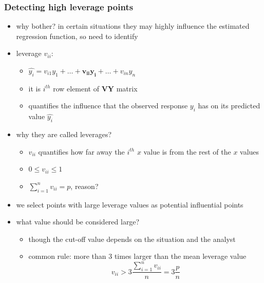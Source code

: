 \documentclass[
	11pt, %
]{beamer}
\begin{document}
\begin{frame}[allowframebreaks]
	\frametitle{Detecting high leverage points}
	\begin{itemize}
		\item why bother? in certain situations they may highly influence the estimated regression function, so need to identify
		\item leverage $v_{ii}$: 
		\begin{itemize}
			\item $\hat{y_i}=v_{i1}y_1+\ldots+\mathbf{v_{ii}y_i}+\ldots+v_{in}y_n$
			\item it is $i^{th}$ row element of $\mathbf{VY}$ matrix
			\item quantifies the influence that the observed response $y_i$ has on its predicted value $\hat{y_i}$
		\end{itemize}
		\item why they are called leverages?
		\begin{itemize}
			\item $v_{ii}$ quantifies how far away the $i^{th}$ $x$ value is from the rest of the $x$ values
		   \item $0 \leq v_{ii} \leq 1$
		   \item $\sum_{i=1}^n v_{ii}=p$, reason?
		\end{itemize}
		\item we select points with large leverage values as potential influential points
		\item what value should be considered large? 
		\begin{itemize}
			\item though the cut-off value depends on the situation and the analyst
			\item common rule: more than 3 times larger than the mean leverage value
			\begin{equation*}
				v_{ii}>3\frac{\sum_{i=1}^n v_{ii}}{n}=3\frac{p}{n}
			\end{equation*}
		\end{itemize}
	\end{itemize}
\end{frame}
\end{document}
